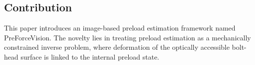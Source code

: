 

\subsection{Contribution}
This paper introduces an image-based preload estimation framework named PreForceVision. The novelty lies in treating preload estimation as a mechanically constrained inverse problem, where deformation of the optically accessible bolt-head surface is linked to the internal preload state.

